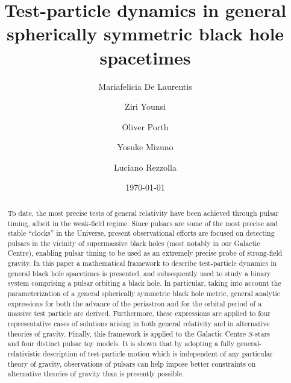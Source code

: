 \documentclass[a4paper,aps,twocolumn,showpacs,showkeys,nofootinbib,preprintnumbers,superscriptaddress,amsmath,amssymb,amsfonts]{revtex4-1}
\begin{document}
\title{Test-particle dynamics in general spherically symmetric black hole spacetimes}

\author{Mariafelicia De Laurentis}
 
\author{Ziri Younsi}

\author{Oliver Porth}

\author{Yosuke Mizuno}

\author{Luciano Rezzolla}
 
\date{\today}
\begin{abstract}
To date, the most precise tests of general relativity
have been achieved through pulsar timing, albeit in the weak-field regime.
Since pulsars are some of the most precise and stable ``clocks'' in the Universe,
present observational efforts are focused on detecting pulsars in the vicinity of
supermassive black holes (most notably in our Galactic Centre), enabling pulsar timing
to be used as an extremely precise probe of strong-field gravity.
In this paper a mathematical framework to describe
test-particle dynamics in general black hole spacetimes is presented, and subsequently
used to study a binary system comprising a pulsar orbiting a black hole.
In particular, taking into account the parameterization of
a general spherically symmetric black hole metric,
general analytic expressions for both the advance of the periastron and for
the orbital period of a massive test particle are derived.
Furthermore, these expressions are applied to four
representative cases of solutions arising in both general relativity and in
alternative theories of gravity. 
Finally, this framework is applied to
the Galactic Centre $S$-stars and four distinct pulsar toy models.
It is shown that by adopting a fully general-relativistic description of
test-particle motion which is independent of any particular theory of gravity,
observations of pulsars can help impose better constraints on
alternative theories of gravity than is presently possible.
\end{abstract}
\end{document}
